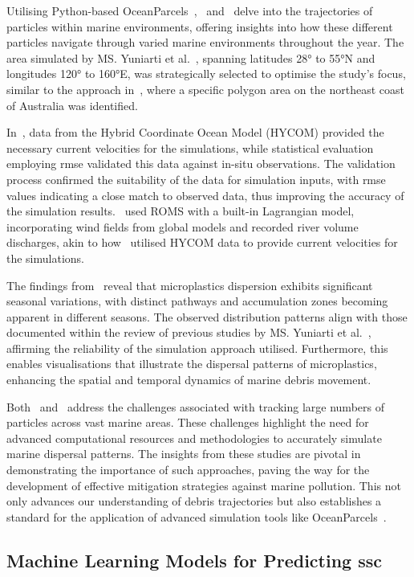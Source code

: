 Utilising Python-based OceanParcels~\cite{20},~\cite{37} and~\cite{38} delve into the trajectories of particles within marine environments, offering insights into how these different particles navigate through varied marine environments throughout the year. The area simulated by MS. Yuniarti et al.~\cite{37}, spanning latitudes 28° to 55°N and longitudes 120° to 160°E, was strategically selected to optimise the study's focus, similar to the approach in~\cite{38}, where a specific polygon area on the northeast coast of Australia was identified. 

In~\cite{37}, data from the Hybrid Coordinate Ocean Model (HYCOM) provided the necessary current velocities for the simulations, while statistical evaluation employing \acrshort{rmse} validated this data against in-situ observations. The validation process confirmed the suitability of the data for simulation inputs, with \acrshort{rmse} values indicating a close match to observed data, thus improving the accuracy of the simulation results.~\cite{38} used ROMS with a built-in Lagrangian model, incorporating wind fields from global models and recorded river volume discharges, akin to how~\cite{37} utilised HYCOM data to provide current velocities for the simulations.

The findings from~\cite{37} reveal that microplastics dispersion exhibits significant seasonal variations, with distinct pathways and accumulation zones becoming apparent in different seasons. The observed distribution patterns align with those documented within the review of previous studies by MS. Yuniarti et al.~\cite{37}, affirming the reliability of the simulation approach utilised. Furthermore, this enables visualisations that illustrate the dispersal patterns of microplastics, enhancing the spatial and temporal dynamics of marine debris movement.

Both~\cite{37} and~\cite{38} address the challenges associated with tracking large numbers of particles across vast marine areas. These challenges highlight the need for advanced computational resources and methodologies to accurately simulate marine dispersal patterns. The insights from these studies are pivotal in demonstrating the importance of such approaches, paving the way for the development of effective mitigation strategies against marine pollution. This not only advances our understanding of debris trajectories but also establishes a standard for the application of advanced simulation tools like OceanParcels~\cite{20}.

\subsection{Machine Learning Models for Predicting \acrshort{ssc}}
\label{subsec:2.2.2}

